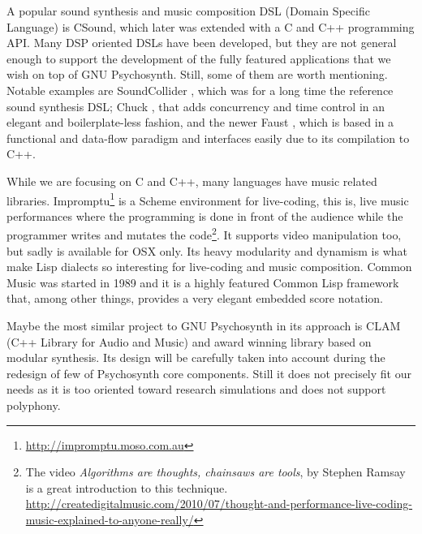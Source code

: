 A popular sound synthesis and music composition DSL (Domain Specific
Language) is CSound, which later was extended with a C and C++
programming API\cite{boulanger00csound}. Many DSP oriented DSLs have
been developed, but they are not general enough to support the
development of the fully featured applications that we wish on top of
GNU Psychosynth. Still, some of them are worth mentioning. Notable
examples are SoundCollider \cite{mccartney2002supercollider}, which
was for a long time the reference sound synthesis DSL; Chuck
\cite{wang03chuck}, that adds concurrency and time control in an
elegant and boilerplate-less fashion, and the newer Faust
\cite{orlarey09faust}, which is based in a functional and data-flow
paradigm and interfaces easily due to its compilation to C++.

While we are focusing on C and C++, many languages have music related
libraries. Impromptu\footnote{\url{http://impromptu.moso.com.au}} is a
Scheme environment for live-coding, this is, live music performances
where the programming is done in front of the audience while the
programmer writes and mutates the code\footnote{The video
  \emph{Algorithms are thoughts, chainsaws are tools}, by Stephen
  Ramsay is a great introduction to this
  technique. \\\url{http://createdigitalmusic.com/2010/07/thought-and-performance-live-coding-music-explained-to-anyone-really/}}. It
supports video manipulation too, but sadly is available for OSX
only. Its heavy modularity and dynamism is what make Lisp dialects so
interesting for live-coding and music composition. Common
Music\cite{taube97common} was started in 1989 and it is a highly
featured Common Lisp framework that, among other things, provides a
very elegant embedded score notation.

Maybe the most similar project to GNU Psychosynth in its approach is
CLAM (C++ Library for Audio and Music) and award winning library based
on modular synthesis\cite{amatriain2006clam}. Its design will be
carefully taken into account during the redesign of few of Psychosynth
core components. Still it does not precisely fit our needs as it is too
oriented toward research simulations and does not support polyphony.


